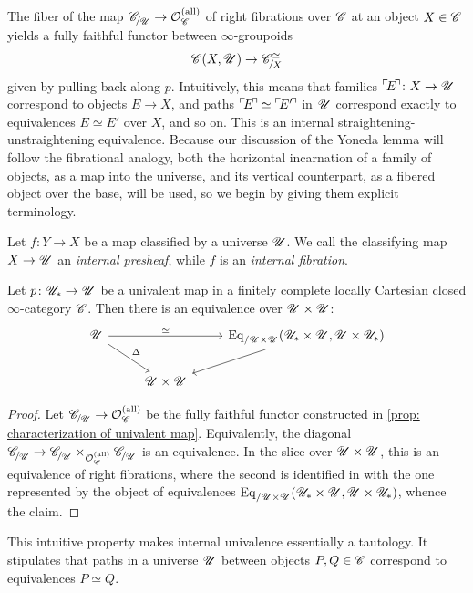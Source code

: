 \documentclass[twoside,a4paper,11pt]{amsart}
\begin{document}
  The fiber of the map $\slice{\C}{\U}\to\Orb_\C^{(\mathrm{all})}$ of right fibrations over $\mathscr{C}$ at an object $X\in\mathscr{C}$ yields a fully faithful functor between $\infty$-groupoids
  \[\C(X,\U)\to \slice{\C}{X}^\simeq\]
  given by pulling back along $p$. Intuitively, this means that families $\corner{E}\colon X\to\U$ correspond to objects $E\to X$, and paths $\corner{E}\simeq \corner{E'}$ in $\mathscr{U}$ correspond exactly to equivalences $E \simeq E'$ over $X$, and so on. This is an internal straightening-unstraightening equivalence. Because our discussion of the Yoneda lemma will follow the fibrational analogy, both the horizontal incarnation of a family of objects, as a map into the universe, and its vertical counterpart, as a fibered object over the base, will be used, so we begin by giving them explicit terminology. 
\begin{definition}\label{terminology: internal fibrations and presheaves}
    Let $f\colon Y\to X$ be a map classified by a universe $\mathscr{U}$. We call the classifying map $X\to\mathscr{U}$ an \textit{internal presheaf}, while $f$ is an \textit{internal fibration}.
\end{definition}
\begin{prop}\label{prop: a universe is an object of equivalences}
    Let $p\colon\mathscr{U}_\ast\to\mathscr{U}$ be a univalent map in a finitely complete locally Cartesian closed $\infty$-category $\mathscr{C}$. Then there is an equivalence over $\mathscr{U}\times\mathscr{U}$:
    \begin{equation*}
        \begin{tikzcd}[ampersand replacement=\&]
        \U \&\& {\Eq_{/\U\times\U}(\U_\ast\times\U,\U\times\U_\ast)} \\
        \& {\U\times\U}
        \arrow[from=1-1, to=1-3, "\simeq"]
        \arrow[from=1-1, to=2-2, "\Delta"]
        \arrow[from=1-3, to=2-2]
    \end{tikzcd}
       \end{equation*}
\end{prop}
\begin{proof}
 Let $\slice{\C}{\U}\to\Orb_\C^{(\mathrm{all})}$ be the fully faithful functor constructed in \cref{prop: characterization of univalent map}. Equivalently, the diagonal $\slice{\C}{\U}\to\slice{\C}{\U}\times_{\Orb_\C^{(\mathrm{all})}}\slice{\C}{\U}$ is an equivalence. In the slice over $\mathscr{U}\times\mathscr{U}$, this is an equivalence of right fibrations, where the second is identified in \cite[Lemma~2.12]{Rasekh_UnivalenceHigherCategoryTheory} with the one represented by the object of equivalences $\mathrm{Eq}_{/\mathscr{U}\times\mathscr{U}}(\mathscr{U}_\ast\times\mathscr{U},\mathscr{U}\times\mathscr{U}_\ast)$, whence the claim.
\end{proof}
This intuitive property makes internal univalence essentially a tautology. It stipulates that paths in a universe $\mathscr{U}$ between objects $P,Q\in\mathscr{C}$ correspond to equivalences $P\simeq Q$. 
\end{document}
